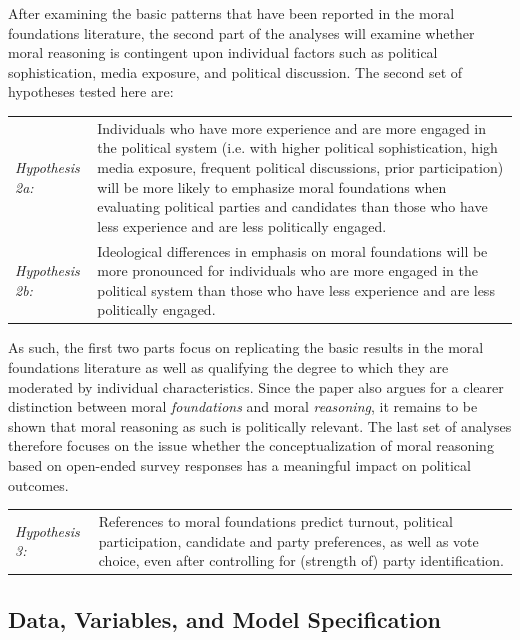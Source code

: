 \documentclass[12pt]{article}
\begin{document}
After examining the basic patterns that have been reported in the moral foundations literature, the second part of the analyses will examine whether moral reasoning is contingent upon individual factors such as political sophistication, media exposure, and political discussion. The second set of hypotheses tested here are:

\vspace{0.3cm}
\begin{tabular}{lp{12cm}}
\textsl{Hypothesis 2a:} & Individuals who have more experience and are more engaged in the political system (i.e. with higher political sophistication, high media exposure, frequent political discussions, prior participation) will be more likely to emphasize moral foundations when evaluating political parties and candidates than those who have less experience and are less politically engaged. \\
\textsl{Hypothesis 2b:} & Ideological differences in emphasis on moral foundations will be more pronounced for individuals who are more engaged in the political system than those who have less experience and are less politically engaged.
\end{tabular}
\vspace{0.5cm}

As such, the first two parts focus on replicating the basic results in the moral foundations literature as well as qualifying the degree to which they are moderated by individual characteristics. Since the paper also argues for a clearer distinction between moral \textit{foundations} and moral \textit{reasoning}, it remains to be shown that moral reasoning as such is politically relevant. The last set of analyses therefore focuses on the issue whether the conceptualization of moral reasoning based on open-ended survey responses has a meaningful impact on political outcomes.

\vspace{0.3cm}
\begin{tabular}{lp{12cm}}
\textsl{Hypothesis 3:} & References to moral foundations predict turnout, political participation, candidate and party preferences, as well as vote choice, even after controlling for (strength of) party identification.
\end{tabular}
\vspace{0.5cm}


\subsection{Data, Variables, and Model Specification}
\end{document}
